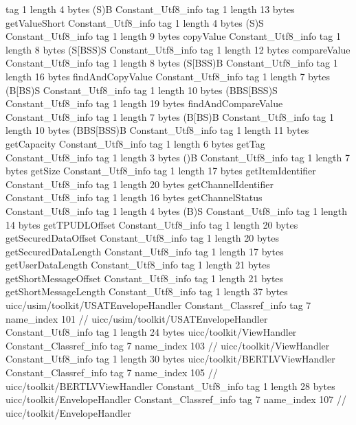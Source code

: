 {{{			tag	1
			length	4
			bytes	(S)B
		}
		Constant_Utf8_info {
			tag	1
			length	13
			bytes	getValueShort
		}
		Constant_Utf8_info {
			tag	1
			length	4
			bytes	(S)S
		}
		Constant_Utf8_info {
			tag	1
			length	9
			bytes	copyValue
		}
		Constant_Utf8_info {
			tag	1
			length	8
			bytes	(S[BSS)S
		}
		Constant_Utf8_info {
			tag	1
			length	12
			bytes	compareValue
		}
		Constant_Utf8_info {
			tag	1
			length	8
			bytes	(S[BSS)B
		}
		Constant_Utf8_info {
			tag	1
			length	16
			bytes	findAndCopyValue
		}
		Constant_Utf8_info {
			tag	1
			length	7
			bytes	(B[BS)S
		}
		Constant_Utf8_info {
			tag	1
			length	10
			bytes	(BBS[BSS)S
		}
		Constant_Utf8_info {
			tag	1
			length	19
			bytes	findAndCompareValue
		}
		Constant_Utf8_info {
			tag	1
			length	7
			bytes	(B[BS)B
		}
		Constant_Utf8_info {
			tag	1
			length	10
			bytes	(BBS[BSS)B
		}
		Constant_Utf8_info {
			tag	1
			length	11
			bytes	getCapacity
		}
		Constant_Utf8_info {
			tag	1
			length	6
			bytes	getTag
		}
		Constant_Utf8_info {
			tag	1
			length	3
			bytes	()B
		}
		Constant_Utf8_info {
			tag	1
			length	7
			bytes	getSize
		}
		Constant_Utf8_info {
			tag	1
			length	17
			bytes	getItemIdentifier
		}
		Constant_Utf8_info {
			tag	1
			length	20
			bytes	getChannelIdentifier
		}
		Constant_Utf8_info {
			tag	1
			length	16
			bytes	getChannelStatus
		}
		Constant_Utf8_info {
			tag	1
			length	4
			bytes	(B)S
		}
		Constant_Utf8_info {
			tag	1
			length	14
			bytes	getTPUDLOffset
		}
		Constant_Utf8_info {
			tag	1
			length	20
			bytes	getSecuredDataOffset
		}
		Constant_Utf8_info {
			tag	1
			length	20
			bytes	getSecuredDataLength
		}
		Constant_Utf8_info {
			tag	1
			length	17
			bytes	getUserDataLength
		}
		Constant_Utf8_info {
			tag	1
			length	21
			bytes	getShortMessageOffset
		}
		Constant_Utf8_info {
			tag	1
			length	21
			bytes	getShortMessageLength
		}
		Constant_Utf8_info {
			tag	1
			length	37
			bytes	uicc/usim/toolkit/USATEnvelopeHandler
		}
		Constant_Classref_info {
			tag	7
			name_index	101		// uicc/usim/toolkit/USATEnvelopeHandler
		}
		Constant_Utf8_info {
			tag	1
			length	24
			bytes	uicc/toolkit/ViewHandler
		}
		Constant_Classref_info {
			tag	7
			name_index	103		// uicc/toolkit/ViewHandler
		}
		Constant_Utf8_info {
			tag	1
			length	30
			bytes	uicc/toolkit/BERTLVViewHandler
		}
		Constant_Classref_info {
			tag	7
			name_index	105		// uicc/toolkit/BERTLVViewHandler
		}
		Constant_Utf8_info {
			tag	1
			length	28
			bytes	uicc/toolkit/EnvelopeHandler
		}
		Constant_Classref_info {
			tag	7
			name_index	107		// uicc/toolkit/EnvelopeHandler
}}}
